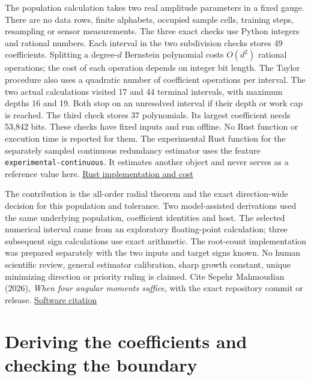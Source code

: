 The population calculation takes two real amplitude parameters in a fixed gauge. There are no data rows, finite alphabets, occupied sample cells, training steps, resampling or sensor measurements. The three exact checks use Python integers and rational numbers. Each interval in the two subdivision checks stores 49 coefficients. Splitting a degree-\(d\) Bernstein polynomial costs \(O(d^2)\) rational operations; the cost of each operation depends on integer bit length. The Taylor procedure also uses a quadratic number of coefficient operations per interval. The two actual calculations visited 17 and 44 terminal intervals, with maximum depths 16 and 19. Both stop on an unresolved interval if their depth or work cap is reached. The third check stores 37 polynomials. Its largest coefficient needs 53,842 bits. These checks have fixed inputs and run offline. No Rust function or execution time is reported for them. The experimental Rust function for the separately sampled continuous redundancy estimator uses the feature \texttt{experimental-continuous}. It estimates another object and never serves as a reference value here. \href{https://github.com/sepahead/pid-rs/blob/main/RUST_IMPLEMENTATION_AND_COST.md}{Rust implementation and cost}

The contribution is the all-order radial theorem and the exact direction-wide decision for this population and tolerance. Two model-assisted derivations used the same underlying population, coefficient identities and host. The selected numerical interval came from an exploratory floating-point calculation; three subsequent sign calculations use exact arithmetic. The root-count implementation was prepared separately with the two inputs and target signs known. No human scientific review, general estimator calibration, sharp growth constant, unique minimizing direction or priority ruling is claimed. Cite Sepehr Mahmoudian (2026), \emph{When four angular moments suffice}, with the exact repository commit or release. \href{https://github.com/sepahead/pid-rs/blob/main/CITATION.cff}{Software citation}

\clearpage

\section{Deriving the coefficients and checking the boundary}\label{deriving-the-coefficients-and-checking-the-boundary}

